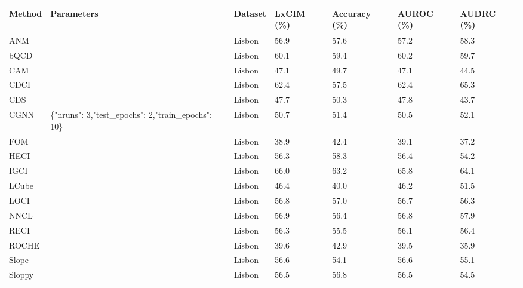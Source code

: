 \begin{tabular}{lllllll}
\toprule
Method & Parameters & Dataset & LxCIM (\%) & Accuracy (\%) & AUROC (\%) & AUDRC (\%) \\
\midrule
ANM &  & Lisbon & 56.9 & 57.6 & 57.2 & 58.3 \\
bQCD &  & Lisbon & 60.1 & 59.4 & 60.2 & 59.7 \\
CAM &  & Lisbon & 47.1 & 49.7 & 47.1 & 44.5 \\
CDCI &  & Lisbon & 62.4 & 57.5 & 62.4 & 65.3 \\
CDS &  & Lisbon & 47.7 & 50.3 & 47.8 & 43.7 \\
CGNN & \{"nruns": 3,"test\_epochs": 2,"train\_epochs": 10\} & Lisbon & 50.7 & 51.4 & 50.5 & 52.1 \\
FOM &  & Lisbon & 38.9 & 42.4 & 39.1 & 37.2 \\
HECI &  & Lisbon & 56.3 & 58.3 & 56.4 & 54.2 \\
IGCI &  & Lisbon & 66.0 & 63.2 & 65.8 & 64.1 \\
LCube &  & Lisbon & 46.4 & 40.0 & 46.2 & 51.5 \\
LOCI &  & Lisbon & 56.8 & 57.0 & 56.7 & 56.3 \\
NNCL &  & Lisbon & 56.9 & 56.4 & 56.8 & 57.9 \\
RECI &  & Lisbon & 56.3 & 55.5 & 56.1 & 56.4 \\
ROCHE &  & Lisbon & 39.6 & 42.9 & 39.5 & 35.9 \\
Slope &  & Lisbon & 56.6 & 54.1 & 56.6 & 55.1 \\
Sloppy &  & Lisbon & 56.5 & 56.8 & 56.5 & 54.5 \\
\bottomrule
\end{tabular}
